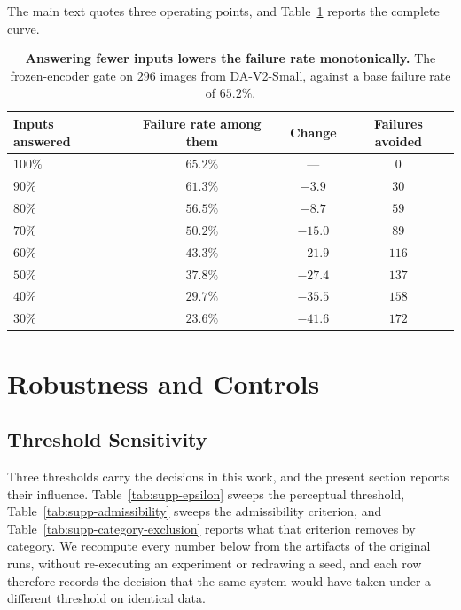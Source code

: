 \documentclass{article} %
\theoremstyle{defstyle}
\theoremstyle{plain}
\begin{document}
The main text quotes three operating points, and Table~\ref{tab:supp-operating} reports the
complete curve.

\begin{table}[!ht]
\caption{\textbf{Answering fewer inputs lowers the failure rate monotonically.} The frozen-encoder
gate on $296$ images from DA-V2-Small, against a base failure rate of $65.2\%$.}
\label{tab:supp-operating}
\begin{center}
\footnotesize
\begin{tabular}{lccc}
\toprule
\textbf{Inputs answered} & \textbf{Failure rate among them} &
\textbf{Change} & \textbf{Failures avoided} \\
\midrule
$100\%$ & $65.2\%$ & --- & $0$ \\
$90\%$  & $61.3\%$ & $-3.9$  & $30$ \\
$80\%$  & $56.5\%$ & $-8.7$  & $59$ \\
$70\%$  & $50.2\%$ & $-15.0$ & $89$ \\
$60\%$  & $43.3\%$ & $-21.9$ & $116$ \\
$50\%$  & $37.8\%$ & $-27.4$ & $137$ \\
$40\%$  & $29.7\%$ & $-35.5$ & $158$ \\
$30\%$  & $23.6\%$ & $-41.6$ & $172$ \\
\bottomrule
\end{tabular}
\end{center}
\end{table}

\section{Robustness and Controls}

\subsection{Threshold Sensitivity}
\label{sec:supp-sensitivity}

Three thresholds carry the decisions in this work, and the present section reports their
influence. Table~\ref{tab:supp-epsilon} sweeps the perceptual threshold,
Table~\ref{tab:supp-admissibility} sweeps the admissibility criterion, and
Table~\ref{tab:supp-category-exclusion} reports what that criterion removes by category. We
recompute every number below from the artifacts of the original runs, without re-executing
an experiment or redrawing a seed, and each row therefore records the decision that the same
system would have taken under a different threshold on identical data.
\end{document}
